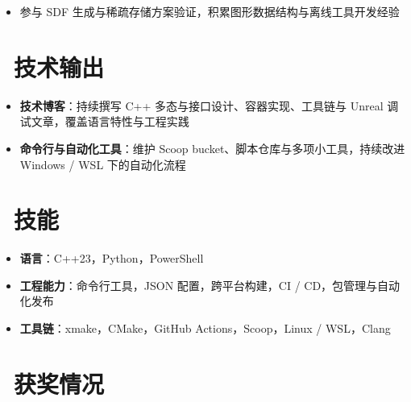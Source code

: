 \documentclass{resume}
\begin{document}
\begin{onehalfspacing}
\begin{itemize}
  \item 参与 SDF 生成与稀疏存储方案验证，积累图形数据结构与离线工具开发经验
\end{itemize}
\end{onehalfspacing}

\section{\faGithub\ 技术输出}
\begin{itemize}[parsep=0.5ex]
  \item \textbf{技术博客}：持续撰写 C++ 多态与接口设计、容器实现、工具链与 Unreal 调试文章，覆盖语言特性与工程实践
  \item \textbf{命令行与自动化工具}：维护 Scoop bucket、脚本仓库与多项小工具，持续改进 Windows / WSL 下的自动化流程
\end{itemize}

\section{\faCogs\ 技能}
\begin{itemize}[parsep=0.5ex]
  \item \textbf{语言}：C++23，Python，PowerShell
  \item \textbf{工程能力}：命令行工具，JSON 配置，跨平台构建，CI / CD，包管理与自动化发布
  \item \textbf{工具链}：xmake，CMake，GitHub Actions，Scoop，Linux / WSL，Clang
\end{itemize}

\section{\faHeartO\ 获奖情况}
\end{document}
